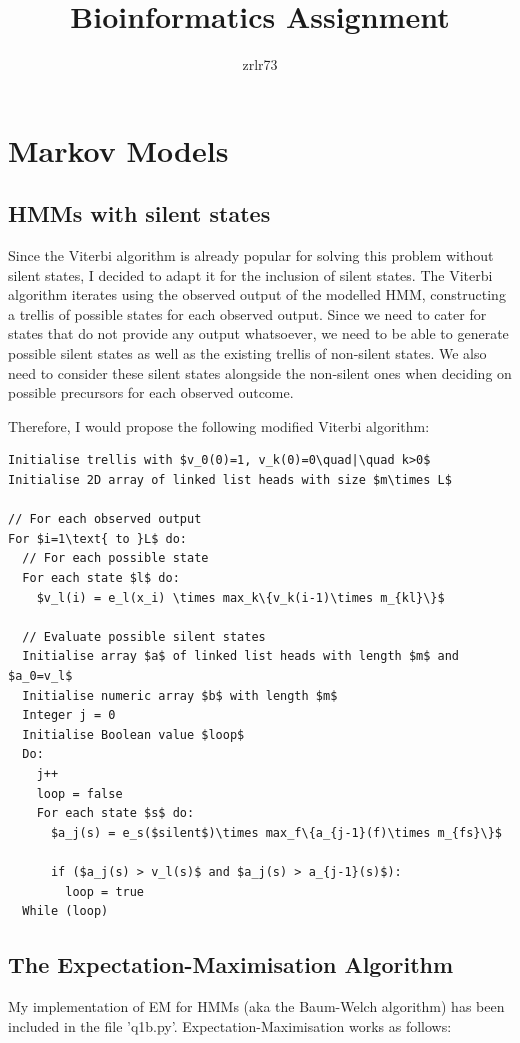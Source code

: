 \documentclass[11pt]{article} %
\title{\vspace{-1.6cm}Bioinformatics Assignment}
\author{zrlr73}
\date{} %
\begin{document}
\maketitle

\section{Markov Models}
\subsection{HMMs with silent states}
Since the Viterbi algorithm is already popular for solving this problem without silent states, I decided to adapt it for the inclusion of silent states. The Viterbi algorithm iterates using the observed output of the modelled HMM, constructing a trellis of possible states for each observed output. Since we need to cater for states that do not provide any output whatsoever, we need to be able to generate possible silent states as well as the existing trellis of non-silent states. We also need to consider these silent states alongside the non-silent ones when deciding on possible precursors for each observed outcome.

Therefore, I would propose the following modified Viterbi algorithm:
\begin{lstlisting}
Initialise trellis with $v_0(0)=1, v_k(0)=0\quad|\quad k>0$
Initialise 2D array of linked list heads with size $m\times L$

// For each observed output
For $i=1\text{ to }L$ do:
  // For each possible state
  For each state $l$ do:
    $v_l(i) = e_l(x_i) \times max_k\{v_k(i-1)\times m_{kl}\}$

  // Evaluate possible silent states
  Initialise array $a$ of linked list heads with length $m$ and $a_0=v_l$
  Initialise numeric array $b$ with length $m$
  Integer j = 0
  Initialise Boolean value $loop$
  Do:
    j++
    loop = false
    For each state $s$ do:
      $a_j(s) = e_s($silent$)\times max_f\{a_{j-1}(f)\times m_{fs}\}$

      if ($a_j(s) > v_l(s)$ and $a_j(s) > a_{j-1}(s)$):
        loop = true
  While (loop)

\end{lstlisting}

\subsection{The Expectation-Maximisation Algorithm}
My implementation of EM for HMMs (aka the Baum-Welch algorithm) has been included in the file 'q1b.py'. Expectation-Maximisation works as follows:
\end{document}
